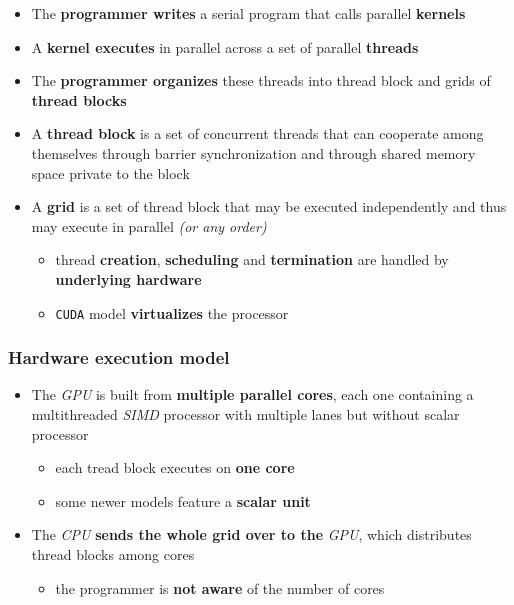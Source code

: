 \documentclass[english]{article}
\begin{document}
\begin{itemize}
  \item The \textbf{programmer writes} a serial program that calls parallel \textbf{kernels}
  \item A \textbf{kernel executes} in parallel across a set of parallel \textbf{threads}
  \item The \textbf{programmer organizes} these threads into thread block and grids of \textbf{thread blocks}
  \item A \textbf{thread block} is a set of concurrent threads that can cooperate among themselves through barrier synchronization and through shared memory space private to the block
  \item A \textbf{grid} is a set of thread block that may be executed independently and thus may execute in parallel \textit{(or any order)}
        \begin{itemize}
          \item thread \textbf{creation}, \textbf{scheduling} and \textbf{termination} are handled by \textbf{underlying hardware}
          \item \texttt{CUDA} model \textbf{virtualizes} the processor
        \end{itemize}
\end{itemize}

\subsubsection{Hardware execution model}

\begin{itemize}
  \item The \textit{GPU} is built from \textbf{multiple parallel cores}, each one containing a multithreaded \textit{SIMD} processor with multiple lanes but without scalar processor
        \begin{itemize}
          \item each tread block executes on \textbf{one core}
          \item some newer models feature a \textbf{scalar unit}
        \end{itemize}
  \item The \textit{CPU} \textbf{sends the whole grid over to the} \textit{GPU}, which distributes thread blocks among cores
        \begin{itemize}
          \item the programmer is \textbf{not aware} of the number of cores
        \end{itemize}
\end{itemize}
\end{document}
